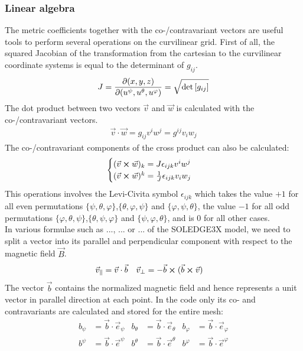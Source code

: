 \subsubsection{Linear algebra}
The metric coefficients together with the co-/contravariant vectors are useful tools to perform several operations on the curvilinear grid. First of all, the squared Jacobian of the transformation from the cartesian to the curvilinear coordinate systems is equal to the determinant of $g_{ij}$. 
\begin{align}
	J = \pdv{(x,y,z)}{(u^\psi, u^\theta, u^\varphi)} = \sqrt{\det\left[g_{ij}\right]} \label{eq:MetricJacobian}
\end{align}
The dot product between two vectors $\vec{v}$ and $\vec{w}$ is calculated with the co-/contravariant vectors.
\begin{align}
	\vec{v}\cdot\vec{w} = g_{ij}v^iw^j = g^{ij}v_iw_j \label{eq:MetricDotProduct}
\end{align}
The co-/contravariant components of the cross product can also be calculated: 
\begin{align}
	\begin{cases}
		(\vec{v} \cross \vec{w})_k = J\epsilon_{ijk}v^iw^j \\
		(\vec{v} \cross \vec{w})^k = \frac{1}{J}\epsilon_{ijk}v_iw_j
	\end{cases} \label{eq:MetricCrossProduct}
\end{align}
This operations involves the Levi-Civita symbol $\epsilon_{ijk}$ which takes the value $+1$ for all even permutations $\{\psi,\theta,\varphi\}$,$\{\theta,\varphi,\psi\}$ and $\{\varphi,\psi,\theta\}$, the value $-1$ for all odd permutations $\{\varphi,\theta,\psi\}$,$\{\theta,\psi,\varphi\}$ and $\{\psi,\varphi,\theta\}$, and is $0$ for all other cases. \\
In various formulae such as ..., ... or ... of the SOLEDGE3X model, we need to split a vector into its parallel and perpendicular component with respect to the magnetic field $\vec{B}$.
\begin{align}
	\vec{v}_\parallel &= \vec{v}\cdot\vec{b} & \vec{v}_\perp &= -\vec{b}\cross (\vec{b}\cross\vec{v}) \label{eq:MetricParalPerpVecComponents}
\end{align}
The vector $\vec{b}$ contains the normalized magnetic field and hence represents a unit vector in parallel direction at each point. In the code only its co- and contravariants are calculated and stored for the entire mesh: 
\begin{align}
	b_\psi &= \vec{b} \cdot \vec{e}_\psi & b_\theta &= \vec{b} \cdot \vec{e}_\theta & b_\varphi &= \vec{b} \cdot \vec{e}_\varphi \label{eq:MetricCovariantUnitB} \\
	b^\psi &= \vec{b} \cdot \vec{e}^\psi & b^\theta &= \vec{b} \cdot \vec{e}^\theta & b^\varphi &= \vec{b} \cdot \vec{e}^\varphi \label{eq:MetricContravariantUnitB}
\end{align} 



